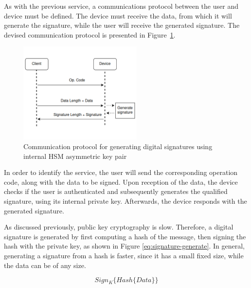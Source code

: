 As with the previous service, a communications protocol between the user and device must be defined. The device must receive the data, from which it will generate the signature, while the user will receive the generated signature.
The devised communication protocol is presented in Figure~\ref{fig:protocol:signature-generate}.
\begin{figure}[h!]
	\centering
	\includegraphics[width=0.55\textwidth]{./Images/signature-generate.png}
	\caption{Communication protocol for generating digital signatures using internal HSM asymmetric key pair}
	\label{fig:protocol:signature-generate}
\end{figure}
In order to identify the service, the user will send the corresponding operation code, along with the data to be signed.
Upon reception of the data, the device checks if the user is authenticated and subsequently generates the qualified signature, using its internal private key.
Afterwards, the device responds with the generated signature.

As discussed previously, public key cryptography is slow. Therefore, a digital signature is generated by first computing a hash of the message, then signing the hash with the private key, as shown in Figure \ref{eq:signature-generate}. In general, generating a signature from a hash is faster, since it has a small fixed size, while the data can be of any size.

\begin{equation}
	\label{eq:signature-generate}
	Sign_{K}\{Hash\{Data\}\}
\end{equation}


